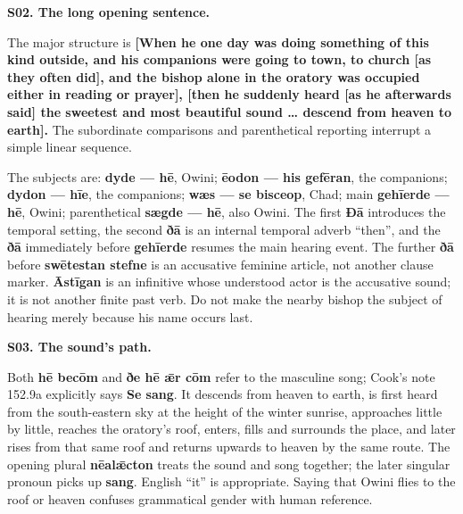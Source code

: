 \par\begin{minipage}{\linewidth}\raggedright
\textbf{S02. The long opening sentence.}

The major structure is \textbf{[When he one day was doing something of this kind outside, and his companions were going to town, to church [as they often did], and the bishop alone in the oratory was occupied either in reading or prayer], [then he suddenly heard [as he afterwards said] the sweetest and most beautiful sound … descend from heaven to earth].} The subordinate comparisons and parenthetical reporting interrupt a simple linear sequence.

The subjects are: \textbf{dyde — hē}, Owini; \textbf{ēodon — his gefēran}, the companions; \textbf{dydon — hīe}, the companions; \textbf{wæs — se bisceop}, Chad; main \textbf{gehīerde — hē}, Owini; parenthetical \textbf{sægde — hē}, also Owini. The first \textbf{Ðā} introduces the temporal setting, the second \textbf{ðā} is an internal temporal adverb “then”, and the \textbf{ðā} immediately before \textbf{gehīerde} resumes the main hearing event. The further \textbf{ðā} before \textbf{swētestan stefne} is an accusative feminine article, not another clause marker. \textbf{Āstīgan} is an infinitive whose understood actor is the accusative sound; it is not another finite past verb. Do not make the nearby bishop the subject of hearing merely because his name occurs last.

\end{minipage}\par\addvspace{4pt}

\par\begin{minipage}{\linewidth}\raggedright
\textbf{S03. The sound’s path.}

Both \textbf{hē becōm} and \textbf{ðe hē ǣr cōm} refer to the masculine song; Cook’s note 152.9a explicitly says \textbf{Se sang}. It descends from heaven to earth, is first heard from the south-eastern sky at the height of the winter sunrise, approaches little by little, reaches the oratory’s roof, enters, fills and surrounds the place, and later rises from that same roof and returns upwards to heaven by the same route. The opening plural \textbf{nēalǣcton} treats the sound and song together; the later singular pronoun picks up \textbf{sang}. English “it” is appropriate. Saying that Owini flies to the roof or heaven confuses grammatical gender with human reference.

\end{minipage}\par\addvspace{4pt}

